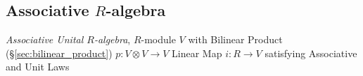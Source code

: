\subsection{Associative $R$-algebra}\label{sec:associative_r_algebra}

\emph{Associative Unital $R$-algebra}, $R$-module $V$ with Bilinear
Product (\S\ref{sec:bilinear_product}) $p : V \otimes V \rightarrow V$
Linear Map $i : R \rightarrow V$ satisfying Associative and Unit Laws
